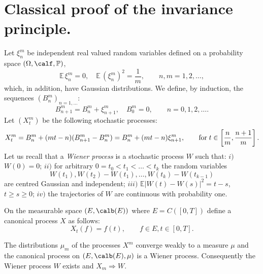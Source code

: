 \documentclass[preprint]{imsart}
\def\P{\mathbb P}
\def\E{\mathbb E}
\begin{document}
{\section{Classical proof of the invariance principle.}



Let $\xi_n^m$ be independent real valued random
variables defined on a probability space $(\Omega,
\calf, \P)$,
$$
\E\, \xi_n^m=0,\quad \E\, (\xi_n^m)^2 =\frac{1}{m},
\qquad n,m=1,2,\ldots,
$$
which, in addition, have Gaussian distributions. We
define, by induction, the sequences
$(B_n^m)_{n=1,\ldots}$:
$$
B_{n+1}^m= B_n^m+\xi_{n+1}^m,\quad B_0^m=0,
\qquad n=0,1,2,\ldots.
$$
Let $(X_t^m)$ be the following stochastic processes:
\begin{equation}\label{defdixt}
X_t^m=B_n^m+(mt-n)(B_{n+1}^m-B_n^m)
= B_n^m+(mt-n)\xi_{n+1}^m,\qquad {\rm for\;}
t\in \left[\frac{n}{m},\frac{n+1}{m}\right].
\end{equation}
Let us recall that a {\em Wiener process} is a
stochastic process $W$ such that: $i)$ $W(0)=0$; $ii)$
for arbitrary $0=t_0 < t_1<\ldots<t_k$ the random
variables
$$
W(t_1),W(t_2)-W(t_1),\ldots,W(t_k)-W(t_{k-1})
$$
are centred
 Gaussian and independent; $iii)$ $\E|W(t)-W(s)|^2 =
t-s$, $t\geq s\geq0$; $iv)$ the trajectories of $W$ are
continuous with probability one.

On the measurable space $(E, \calb(E))$ where
$E=C([0,T])$ define a canonical process $X$ as follows:
$$
X_t(f)=f(t),\qquad f\in E, t\in [0,T].
$$


\begin{Theorem}\label{11.2.1}
The distributions $\mu_m$ of the processes $X^m$
converge weakly to a measure $\mu$ and the canonical
process on $(E,\calb(E),\mu)$ is a Wiener process.
Consequently the Wiener process $W$ exists and
$X_m\Rightarrow W$.
\end{Theorem}

}
\end{document}

